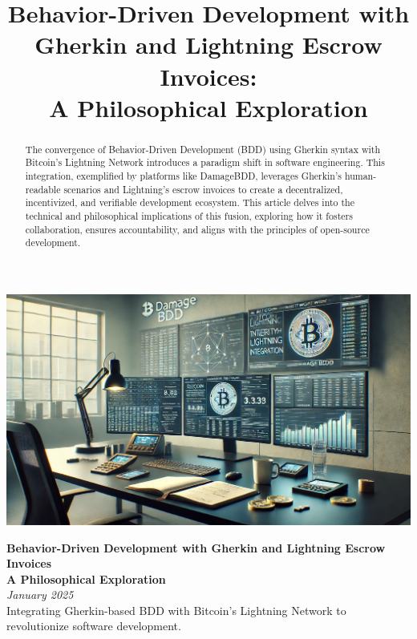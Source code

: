\documentclass[12pt]{article}
\title{\Huge Behavior-Driven Development with Gherkin and Lightning Escrow Invoices: \\ A Philosophical Exploration}
\author{}
\date{}
\begin{document}
\begin{titlepage}
    \centering
    \vspace*{1.5cm}
    \includegraphics[width=\textwidth]{bitcoin_office.png} %
    \vspace*{2cm}
    
    {\Huge \textbf{Behavior-Driven Development with Gherkin and Lightning Escrow Invoices}}\\
    \vspace{0.5cm}
    {\Large \textbf{A Philosophical Exploration}}\\
    \vspace{2cm}
    {\Large \textit{January 2025}}\\
    \vspace{1cm}
    {\normalsize Integrating Gherkin-based BDD with Bitcoin's Lightning Network to revolutionize software development.}\\
    \vfill
\end{titlepage}

\begin{abstract}
The convergence of Behavior-Driven Development (BDD) using Gherkin syntax with Bitcoin's Lightning Network introduces a paradigm shift in software engineering. This integration, exemplified by platforms like DamageBDD, leverages Gherkin's human-readable scenarios and Lightning's escrow invoices to create a decentralized, incentivized, and verifiable development ecosystem. This article delves into the technical and philosophical implications of this fusion, exploring how it fosters collaboration, ensures accountability, and aligns with the principles of open-source development.
\end{abstract}

\end{document}
